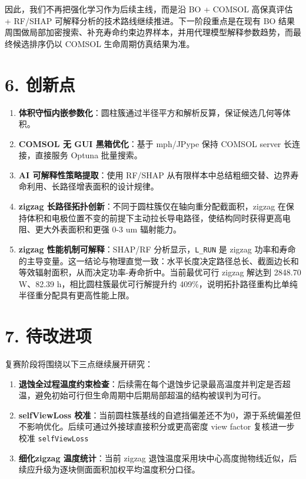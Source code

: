 \documentclass[
  a4paper,
]{ctexart}
\providecommand{\tightlist}{%
  \setlength{\itemsep}{0pt}\setlength{\parskip}{0pt}}
\begin{document}
因此，我们不再把强化学习作为后续主线，而是沿 BO + COMSOL 高保真评估 +
RF/SHAP 可解释分析的技术路线继续推进。下一阶段重点是在现有 BO
结果周围做局部加密搜索、补充寿命约束边界样本，并用代理模型解释参数趋势，而最终候选排序仍以
COMSOL 生命周期仿真结果为准。

\section{6. 创新点}\label{ux521bux65b0ux70b9}

\begin{enumerate}
\def\labelenumi{\arabic{enumi}.}
\tightlist
\item
  \textbf{体积守恒内嵌参数化}：圆柱簇通过半径平方和解析反算，保证候选几何等体积。
\item
  \textbf{COMSOL 无 GUI 黑箱优化}：基于 mph/JPype 保持 COMSOL server
  长连接，直接服务 Optuna 批量搜索。
\item
  \textbf{AI 可解释性策略提取}：使用 RF/SHAP
  从有限样本中总结粗细交替、边界寿命利用、长路径增表面积的设计规律。
\item
  \textbf{zigzag
  长路径拓扑创新}：不同于圆柱簇仅在轴向重分配截面积，zigzag
  在保持体积和电极位置不变的前提下主动拉长导电路径，使结构同时获得更高电阻、更大外表面积和更强
  0-3 um 辐射能力。
\item
  \textbf{zigzag 性能机制可解释}：SHAP/RF 分析显示，\texttt{L\_RUN} 是
  zigzag
  功率和寿命的主导变量。这一结论与物理直觉一致：水平长度决定路径总长、截面边长和等效辐射面积，从而决定功率-寿命折中。当前最优可行
  zigzag 解达到 2848.70 W、82.39 h，相比圆柱簇最优可行解提升约
  409\%，说明拓扑路径重构比单纯半径重分配具有更高性能上限。
\end{enumerate}

\section{7. 待改进项}\label{ux5f85ux6539ux8fdbux9879}

复赛阶段将围绕以下三点继续展开研究：

\begin{enumerate}
\def\labelenumi{\arabic{enumi}.}
\tightlist
\item
  \textbf{退蚀全过程温度约束检查}：后续需在每个退蚀步记录最高温度并判定是否超温，避免初始可行但生命周期中后期局部超温的结构被误判为可行。
\item
  \textbf{selfViewLoss
  校准}：当前圆柱簇基线的自遮挡偏差还不为0，源于系统偏差但不影响优化。后续可通过外接球直接积分或更高密度
  view factor 复核进一步校准 \texttt{selfViewLoss}
\item
  \textbf{细化zigzag 温度统计}：当前 zigzag
  退蚀温度采用块中心高度抛物线近似，后续应升级为逐块侧面面积加权平均温度积分口径。
\end{enumerate}
\end{document}
